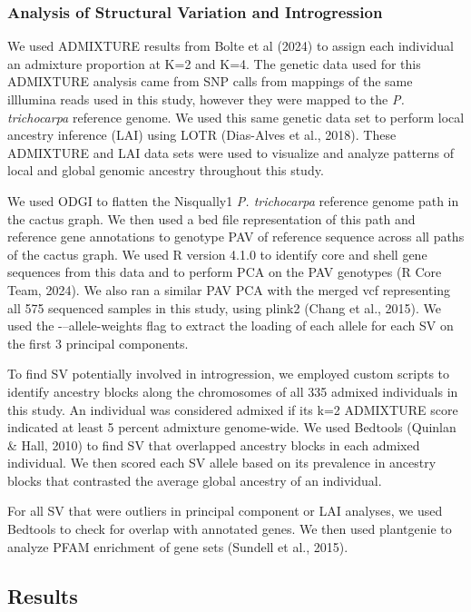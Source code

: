\documentclass[
]{agujournal2019}
\begin{document}
\subsubsection{Analysis of Structural Variation and
Introgression}\label{analysis-of-structural-variation-and-introgression}

We used ADMIXTURE results from Bolte et al (2024) to assign each
individual an admixture proportion at K=2 and K=4. The genetic data used
for this ADMIXTURE analysis came from SNP calls from mappings of the
same illlumina reads used in this study, however they were mapped to the
\emph{P. trichocarpa} reference genome. We used this same genetic data
set to perform local ancestry inference (LAI) using LOTR (Dias-Alves et
al., 2018). These ADMIXTURE and LAI data sets were used to visualize and
analyze patterns of local and global genomic ancestry throughout this
study.

We used ODGI to flatten the Nisqually1 \emph{P. trichocarpa} reference
genome path in the cactus graph. We then used a bed file representation
of this path and reference gene annotations to genotype PAV of reference
sequence across all paths of the cactus graph. We used R version 4.1.0
to identify core and shell gene sequences from this data and to perform
PCA on the PAV genotypes (R Core Team, 2024). We also ran a similar PAV
PCA with the merged vcf representing all 575 sequenced samples in this
study, using plink2 (Chang et al., 2015). We used the
-\/--allele-weights flag to extract the loading of each allele for each
SV on the first 3 principal components.

To find SV potentially involved in introgression, we employed custom
scripts to identify ancestry blocks along the chromosomes of all 335
admixed individuals in this study. An individual was considered admixed
if its k=2 ADMIXTURE score indicated at least 5 percent admixture
genome-wide. We used Bedtools (Quinlan \& Hall, 2010) to find SV that
overlapped ancestry blocks in each admixed individual. We then scored
each SV allele based on its prevalence in ancestry blocks that
contrasted the average global ancestry of an individual.

For all SV that were outliers in principal component or LAI analyses, we
used Bedtools to check for overlap with annotated genes. We then used
plantgenie to analyze PFAM enrichment of gene sets (Sundell et al.,
2015).

\subsection{Results}\label{results}
\end{document}
